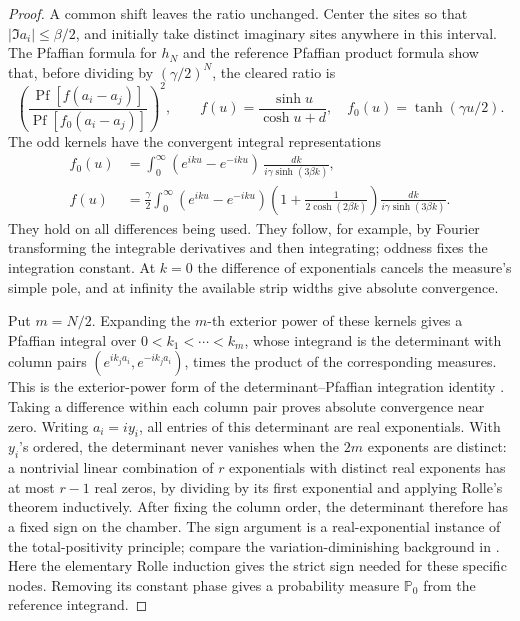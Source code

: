 \begin{proof}
A common shift leaves the ratio unchanged.  Center the sites so
that \(|\Im a_i|\le\beta/2\), and initially take distinct imaginary
sites anywhere in this interval.  The Pfaffian formula for \(h_N\)
and the reference Pfaffian product formula show that, before
dividing by \((\gamma/2)^N\), the cleared ratio is
\[
 \left(\frac{\operatorname{Pf}[f(a_i-a_j)]}
 {\operatorname{Pf}[f_0(a_i-a_j)]}\right)^2,\qquad
 f(u)=\frac{\sinh u}{\cosh u+d},\quad
 f_0(u)=\tanh(\gamma u/2).
\]
The odd kernels have the convergent integral representations
\[
\begin{split}
 f_0(u)&=\int_0^\infty
 (e^{iku}-e^{-iku})\,
 \frac{dk}{i\gamma\sinh(3\beta k)},\\
 f(u)&=\frac{\gamma}{2}\int_0^\infty
 (e^{iku}-e^{-iku})
 \left(1+\frac1{2\cosh(2\beta k)}\right)
 \frac{dk}{i\gamma\sinh(3\beta k)} .
\end{split}
\]
They hold on all differences being used.  They follow, for example,
by Fourier transforming the integrable derivatives and then
integrating; oddness fixes the integration constant.
At \(k=0\) the difference of exponentials cancels the measure's
simple pole, and at infinity the available strip widths give
absolute convergence.

Put \(m=N/2\).
Expanding the \(m\)-th exterior power of these kernels gives a
Pfaffian integral over \(0<k_1<\cdots<k_m\), whose integrand is the
determinant with column pairs
\((e^{ik_j a_i},e^{-ik_j a_i})\), times the product of the
corresponding measures.  This is the exterior-power form of the determinant--Pfaffian
integration identity \cite{deBruijn1955}. Taking a difference within each column
pair proves absolute convergence near zero.
Writing \(a_i=iy_i\), all entries of this determinant are real
exponentials.  With \(y_i\)'s ordered, the determinant never
vanishes when the \(2m\) exponents are distinct: a nontrivial linear
combination of \(r\) exponentials with distinct real exponents has
at most \(r-1\) real zeros, by dividing by its first exponential
and applying Rolle's theorem inductively.  After fixing the column
order, the determinant therefore has a fixed sign on the chamber.
The sign argument is a real-exponential instance of the total-positivity
principle; compare the variation-diminishing background in
\cite{Schoenberg1950PFII}. Here the elementary Rolle induction gives
the strict sign needed for these specific nodes. Removing its constant phase gives a probability measure
\(\mathbb P_0\) from the reference integrand.


\end{proof}
